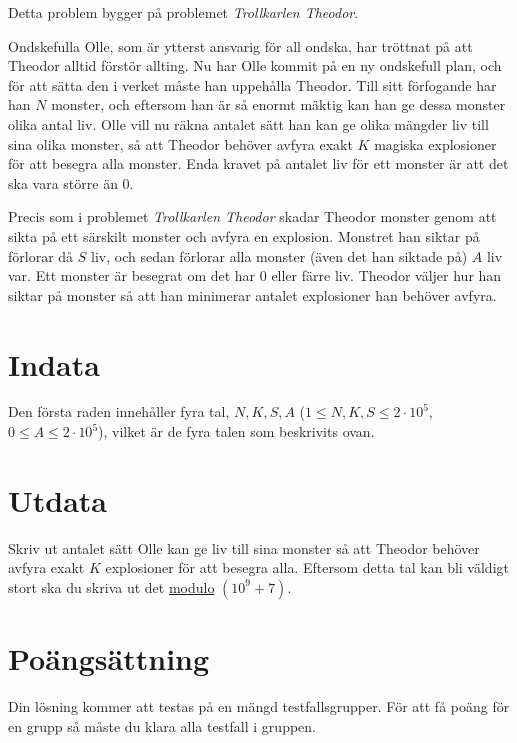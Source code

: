 
\noindent

Detta problem bygger på problemet \textit{Trollkarlen Theodor}.

Ondskefulla Olle, som är ytterst ansvarig för all ondska, har tröttnat på att Theodor alltid förstör allting.
Nu har Olle kommit på en ny ondskefull plan, och för att sätta den i verket måste han uppehålla Theodor.
Till sitt förfogande har han $N$ monster, och eftersom han är så enormt mäktig kan han ge dessa monster
olika antal liv. Olle vill nu räkna antalet sätt han kan ge olika mängder liv till sina olika monster, 
så att Theodor behöver avfyra exakt $K$ magiska explosioner för att besegra alla monster. Enda kravet på antalet liv
för ett monster är att det ska vara större än $0$.

Precis som i problemet \textit{Trollkarlen Theodor} skadar Theodor monster genom att sikta på ett särskilt monster
och avfyra en explosion. Monstret han siktar på förlorar då $S$ liv, och sedan förlorar alla monster (även det han
siktade på) $A$ liv var. 
Ett monster är besegrat om det har 0 eller färre liv.
Theodor väljer hur han siktar på monster så att han minimerar antalet explosioner han behöver avfyra.


\section*{Indata}
Den första raden innehåller fyra tal, $N, K, S, A$ ($1 \leq N,K,S \leq 2\cdot10^5$, $0 \leq A \leq 2\cdot10^5$),
vilket är de fyra talen som beskrivits ovan.

\section*{Utdata}
Skriv ut antalet sätt Olle kan ge liv till sina monster så att Theodor behöver avfyra exakt $K$ explosioner för
att besegra alla. Eftersom detta tal kan bli väldigt stort ska
du skriva ut det \href{https://en.wikipedia.org/wiki/Modulo}{modulo} $(10^9+7)$. 



\section*{Poängsättning}
Din lösning kommer att testas på en mängd testfallsgrupper.
För att få poäng för en grupp så måste du klara alla testfall i gruppen.

